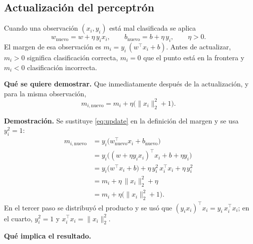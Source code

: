 \documentclass[12pt,a4paper]{article}
\newcommand{\norm}[1]{\lVert #1\rVert}
\begin{document}
\subsection{Actualización del perceptrón}

Cuando una observación $(x_i,y_i)$ está mal clasificada se aplica
\begin{equation}
  w_{\text{nuevo}}=w+\eta\,y_i x_i,
  \qquad
  b_{\text{nuevo}}=b+\eta\,y_i,
  \qquad \eta>0.
  \label{eq:update}
\end{equation}
El margen de esa observación es $m_i=y_i\,(w^\top x_i+b)$. Antes de actualizar,
$m_i>0$ significa clasificación correcta, $m_i=0$ que el punto está en la
frontera y $m_i<0$ clasificación incorrecta.

\begin{cajaIdea}
  \textbf{Qué se quiere demostrar.} Que inmediatamente después de la
  actualización, y para la misma observación,
  \begin{equation}
    m_{i,\text{nuevo}}=m_i+\eta\bigl(\norm{x_i}_2^2+1\bigr).
    \label{eq:margen}
  \end{equation}
\end{cajaIdea}

\textbf{Demostración.} Se sustituye \eqref{eq:update} en la definición del
margen y se usa $y_i^2=1$:
\begin{equation}
\begin{aligned}
  m_{i,\text{nuevo}}
  &= y_i\bigl(w_{\text{nuevo}}^\top x_i+b_{\text{nuevo}}\bigr)\\
  &= y_i\bigl((w+\eta y_i x_i)^\top x_i+b+\eta y_i\bigr)\\
  &= y_i\bigl(w^\top x_i+b\bigr)
     +\eta\,y_i^2\,x_i^\top x_i
     +\eta\,y_i^2\\
  &= m_i+\eta\,\norm{x_i}_2^2+\eta\\
  &= m_i+\eta\bigl(\norm{x_i}_2^2+1\bigr).
\end{aligned}
  \label{eq:demo}
\end{equation}
En el tercer paso se distribuyó el producto y se usó que
$(y_i x_i)^\top x_i=y_i\,x_i^\top x_i$; en el cuarto, $y_i^2=1$ y
$x_i^\top x_i=\norm{x_i}_2^2$.

\textbf{Qué implica el resultado.}
\end{document}

